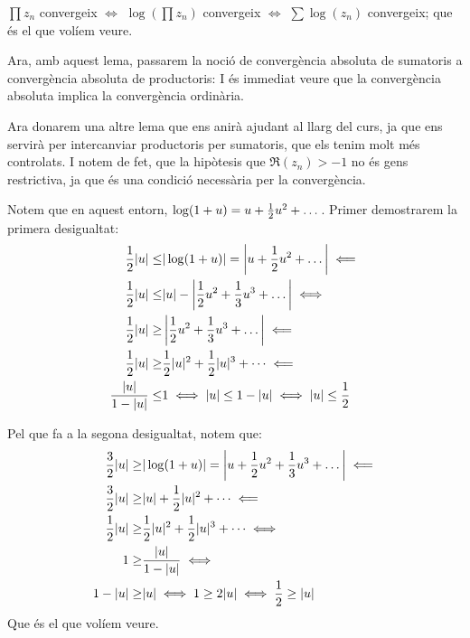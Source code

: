 \begin{pf}
    $\prod z_n$ convergeix $\iff$ $\log\left(\prod z_n\right)$ convergeix $\iff$ $\sum\log(z_n)$ convergeix; que és el que volíem veure.
\end{pf}
Ara, amb aquest lema, passarem la noció de convergència absoluta de sumatoris a convergència absoluta de productoris:
I és immediat veure que la convergència absoluta implica la convergència ordinària.\par

Ara donarem una altre lema que ens anirà ajudant al llarg del curs, ja que ens servirà per intercanviar productoris per sumatoris, que els tenim molt més 
controlats. I notem de fet, que la hipòtesis que $\Re(z_n)>-1$ no és gens restrictiva, ja que és una condició necessària per la convergència.
\begin{pf}
    Notem que en aquest entorn, $\log(1+u)=u+\frac{1}{2} u^2+\dots$. Primer demostrarem la primera desigualtat:
    \begin{align*}
        \frac{1}{2}|u|\leq& |\log(1+u)|=\left|u+\frac{1}{2} u^2+\dots\right|\impliedby\\
        \frac{1}{2}|u|\leq&|u|-\left|\frac{1}{2} u^2+\frac{1}{3}u^3+\dots\right|\iff\\
        \frac{1}{2}|u|\geq&\left|\frac{1}{2} u^2+\frac{1}{3}u^3+\dots\right|\impliedby\\
        \frac{1}{2}|u|\geq&\frac{1}{2}|u|^2+\frac{1}{2}|u|^3+\dots\impliedby\\
        \frac{|u|}{1-|u|}\leq&1\iff |u|\leq 1-|u|\iff|u|\leq \frac{1}{2}
    \end{align*}

    Pel que fa a la segona desigualtat, notem que:
    \begin{align*}
        \frac{3}{2}|u|\geq&|\log(1+u)|=\left|u+\frac{1}{2} u^2 +\frac{1}{3}u^3+\dots\right|\impliedby\\
        \frac{3}{2}|u|\geq&|u|+\frac{1}{2}|u|^2+\dots\impliedby\\
        \frac{1}{2}|u|\geq&\frac{1}{2}|u|^2+\frac{1}{2}|u|^3+\dots\iff\\
        1\geq&\frac{|u|}{1-|u|}\iff\\
        1-|u|\geq&{|u|}\iff1\geq2|u|\iff\frac{1}{2}\geq|u|
    \end{align*}
    Que és el que volíem veure.
\end{pf}

